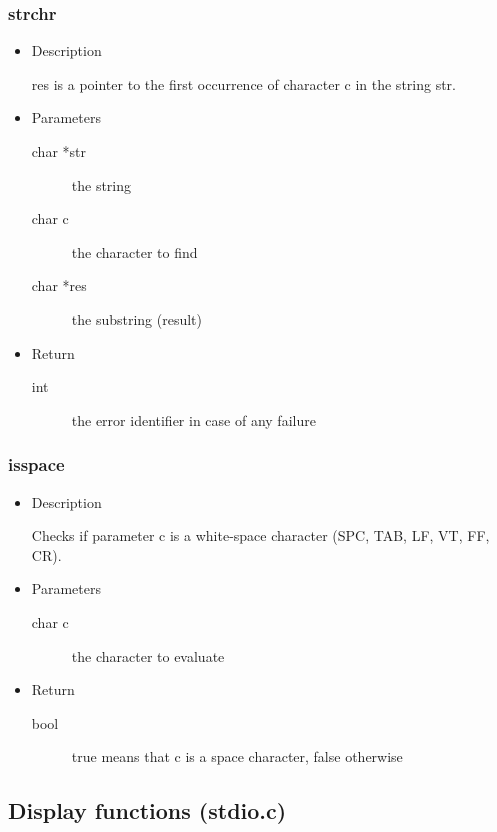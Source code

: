 \subsubsection{strchr}
\begin{itemize}
  \item{Description}

	 res is a pointer to the first occurrence of character c in the string str.
  \item{Parameters}
	 \begin{description}
		\item[char *str] the string
		\item[char c] the character to find
		\item[char *res] the substring (result)
	 \end{description}
  \item{Return}
	 \begin{description}
		\item[int] the error identifier in case of any failure
	 \end{description}
\end{itemize}

\subsubsection{isspace}
\begin{itemize}
  \item{Description}

	 Checks if parameter c is a white-space character (SPC, TAB, LF, VT, FF, CR).
  \item{Parameters}
	 \begin{description}
		\item[char c] the character to evaluate
	 \end{description}
  \item{Return}
	 \begin{description}
		\item[bool] true means that c is a space character, false otherwise
	 \end{description}
\end{itemize}

\subsection{Display functions (stdio.c)}

